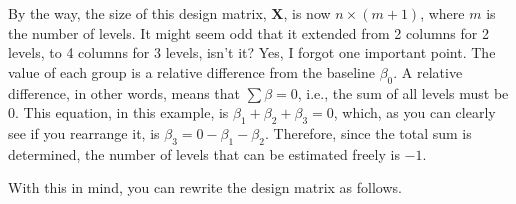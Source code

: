 \documentclass{ltjsbook}
\begin{document}
By the way, the size of this design matrix, $\bm{X}$, is now $n \times (m+1)$, where $m$ is the number of levels. It might seem odd that it extended from 2 columns for 2 levels, to 4 columns for 3 levels, isn't it?
Yes, I forgot one important point. The value of each group is a relative difference from the baseline $\beta_0$. A relative difference, in other words, means that $\sum \beta =0$, i.e., the sum of all levels must be $0$. This equation, in this example, is $\beta_1+\beta_2+\beta_3=0$, which, as you can clearly see if you rearrange it, is $\beta_3 = 0 - \beta_1 - \beta_2$. Therefore, since the total sum is determined, the number of levels that can be estimated freely is $-1$.

With this in mind, you can rewrite the design matrix as follows.
\end{document}
